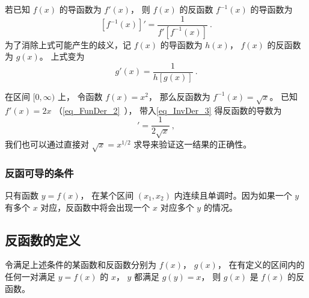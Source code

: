 

若已知 $f(x)$ 的导函数为 $f'(x)$， 则 $f(x)$ 的反函数 $f^{-1}(x)$ 的导函数为
\begin{equation}\label{eq_InvDer_3}
[f^{-1}(x)]' = \frac{1}{f'[f^{-1}(x)]} ~.
\end{equation} 
为了消除上式可能产生的歧义，记 $f(x)$ 的导函数为 $h(x)$，  $f(x)$ 的反函数为 $g(x)$。 上式变为
 \begin{equation}
g'(x) = \frac{1}{h[g(x)]}~.
\end{equation}

\begin{example}{}
在区间 $[0, \infty)$ 上， 令函数 $f(x) = x^2$， 那么反函数为 $f^{-1}(x) = \sqrt{x}$。 已知 $f'(x) = 2x$ （\autoref{eq_FunDer_2}~）， 带入\autoref{eq_InvDer_3} 得反函数的导数为
\begin{equation}
[f^{-1}(x)]' = \frac{1}{2\sqrt{x}} ~,
\end{equation}
我们也可以通过直接对 $\sqrt{x} = x^{1/2}$ 求导来验证这一结果的正确性。
\end{example}

\subsubsection{反函可导的条件}
只有函数 $y = f(x)$， 在某个区间 $(x_1, x_2)$ 内连续且单调时。因为如果一个 $y$ 有多个 $x$ 对应，反函数中将会出现一个 $x$ 对应多个 $y$ 的情况。

\subsection{反函数的定义}
令满足上述条件的某函数和反函数分别为 $f(x)$，  $g(x)$， 在有定义的区间内的任何一对满足 $y = f(x)$ 的 $x$，  $y$ 都满足 $g(y) = x$， 则 $g(x)$ 是 $f(x)$ 的反函数。

